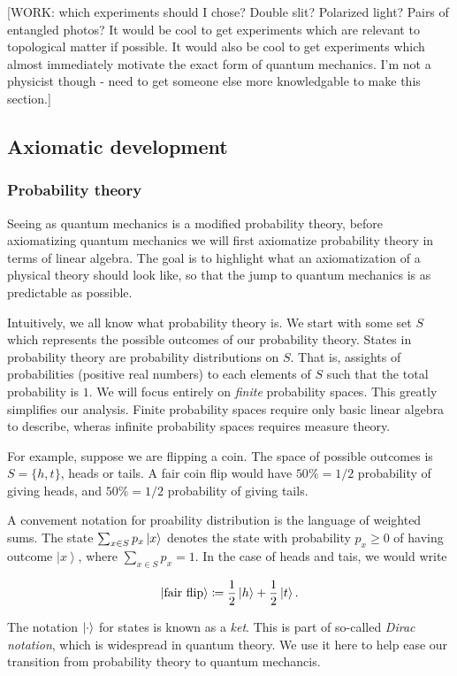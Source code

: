\documentclass{article}
\theoremstyle{definition}
\newcommand{\0}{\left|0\right>}
\newcommand{\1}{\left|1\right>}
\numberwithin{figure}{section}
\begin{document}
[WORK: which experiments should I chose? Double slit? Polarized light? Pairs of entangled photos? It would be cool to get experiments which are relevant to topological matter if possible. It would also be cool to get experiments which almost immediately motivate the exact form of quantum mechanics. I'm not a physicist though - need to get someone else more knowledgable to make this section.]

\subsection{Axiomatic development}

\subsubsection{Probability theory}

Seeing as quantum mechanics is a modified probability theory, before axiomatizing quantum mechanics we will first axiomatize probability theory in terms of linear algebra. The goal is to highlight what an axiomatization of a physical theory should look like, so that the jump to quantum mechanics is as predictable as possible.

Intuitively, we all know what probability theory is. We start with some set $S$ which represents the possible outcomes of our probability theory. States in probability theory are probability distributions on $S$. That is, assights of probabilities (positive real numbers) to each elements of $S$ such that the total probability is $1$. We will focus entirely on \textit{finite} probability spaces. This greatly simplifies our analysis. Finite probability spaces require only basic linear algebra to describe, wheras infinite probability spaces requires measure theory.

For example, suppose we are flipping a coin. The space of possible outcomes is $S=\{h,t\}$, heads or tails. A fair coin flip would have $50\%=1/2$ probability of giving heads, and $50\%=1/2$ probability of giving tails.

A convement notation for proability distribution is the language of weighted sums. The state $\sum_{x\in S}p_x\ket{x}$ denotes the state with probability $p_x\geq 0$ of having outcome $\left| x\right>$, where $\sum_{x\in S}p_x=1$. In the case of heads and tais, we would write

$$\ket{\text{fair flip}}\coloneqq\frac{1}{2}\ket{h}+\frac{1}{2}\ket{t}.$$

The notation $\ket{\cdot}$ for states is known as a \textit{ket}. This is part of so-called \textit{Dirac notation}, which is widespread in quantum theory. We use it here to help ease our transition from probability theory to quantum mechancis.
\end{document}
